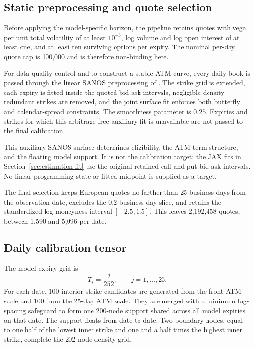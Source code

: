 \subsection{Static preprocessing and quote selection}
\label{app:pipeline-static}

Before applying the model-specific horizon, the pipeline retains quotes with
vega per unit total volatility of at least $10^{-3}$, log volume and log open
interest of at least one, and at least ten surviving options per expiry. The
nominal per-day quote cap is 100,000 and is therefore non-binding here.

For data-quality control and to construct a stable ATM curve, every daily book
is passed through the linear SANOS preprocessing of \citet{SANOS2026}. The
strike grid is extended, each expiry is fitted inside the quoted bid-ask
intervals, negligible-density redundant strikes are removed, and the joint
surface fit enforces both butterfly and calendar-spread constraints. The
smoothness parameter is $0.25$. Expiries and strikes for which this
arbitrage-free auxiliary fit is unavailable are not passed to the final
calibration.

This auxiliary SANOS surface determines eligibility, the ATM term structure,
and the floating model support. It is not the calibration target: the JAX fits
in Section~\ref{sec:estimation-fit} use the original retained call and put
bid-ask intervals. No linear-programming state or fitted midpoint is supplied
as a target.

The final selection keeps European quotes no farther than 25 business days
from the observation date, excludes the $0.2$-business-day slice, and retains
the standardized log-moneyness interval $[-2.5,1.5]$. This leaves 2,192,458
quotes, between 1,590 and 5,096 per date.

\subsection{Daily calibration tensor}
\label{app:pipeline-tensor}

The model expiry grid is
\[
  T_j=\frac{j}{252},\qquad j=1,\ldots,25.
\]
For each date, 100 interior-strike candidates are generated from the front
ATM scale and 100 from the 25-day ATM scale. They are merged with a minimum
log-spacing safeguard to form one 200-node support shared across all model
expiries on that date. The support floats from date to date. Two boundary
nodes, equal to one half of the lowest inner strike and one and a half times
the highest inner strike, complete the 202-node density grid.

